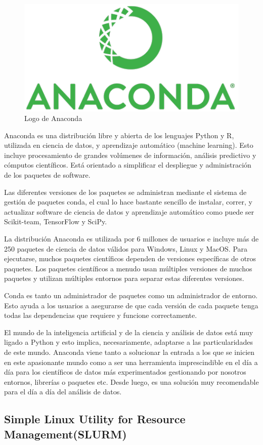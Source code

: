 \begin{figure}[h]
    \centering
    \includegraphics[width=.5\textwidth]{images/anaconda.png}
    \caption{Logo de Anaconda}
    \label{fig:img2}
\end{figure}
Anaconda es una distribución libre y abierta de los lenguajes Python y R, utilizada en ciencia de datos, y aprendizaje automático (machine learning). Esto incluye procesamiento de grandes volúmenes de información, análisis predictivo y cómputos científicos. Está orientado a simplificar el despliegue y administración de los paquetes de software. 

Las diferentes versiones de los paquetes se administran mediante el sistema de gestión de paquetes conda, el cual lo hace bastante sencillo de instalar, correr, y actualizar software de ciencia de datos y aprendizaje automático como puede ser Scikit-team, TensorFlow y SciPy. 

La distribución Anaconda es utilizada por 6 millones de usuarios e incluye más de 250 paquetes de ciencia de datos válidos para Windows, Linux y MacOS.
Para ejecutarse, muchos paquetes científicos dependen de versiones específicas de otros paquetes. Los paquetes científicos a menudo usan múltiples versiones de muchos paquetes y utilizan múltiples entornos para separar estas diferentes versiones.

Conda es tanto un administrador de paquetes como un administrador de entorno. Esto ayuda a los usuarios a asegurarse de que cada versión de cada paquete tenga todas las dependencias que requiere y funcione correctamente.

El mundo de la inteligencia artificial y de la ciencia y análisis de datos está muy ligado a Python y esto implica, necesariamente, adaptarse a las particularidades de este mundo. Anaconda viene tanto a solucionar la entrada a los que se inicien en este apasionante mundo como a ser una herramienta imprescindible en el día a día para los científicos de datos más experimentados gestionando por nosotros entornos, librerías o paquetes etc. Desde luego, es una solución muy recomendable para el día a día del análisis de datos.
\newpage

\subsection{Simple Linux Utility for Resource Management(SLURM)}

